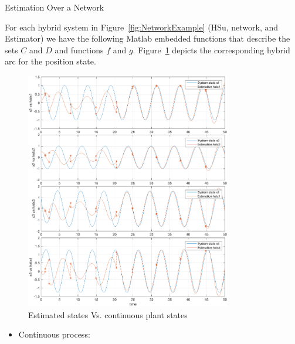 \begin{example}{Estimation Over a Network}
\begin{itemize}
\end{itemize}



For each hybrid system in Figure~\ref{fig:NetworkExample} (HSu, network, and Estimator) we have the following Matlab embedded functions that describe the sets $C$ and $D$ and functions $f$ and $g$.
Figure~\ref{fig:Net-Est} depicts the corresponding hybrid arc for the position state.

\begin{figure}[ht]
  \begin{center}
    \includegraphics[width=0.8\textwidth]{figures/Simulink/ResultsNetworkEstimator1.eps}
   \caption{Estimated states Vs. continuous plant states}
\label{fig:Net-Est}
  \end{center}
\end{figure}


\begin{itemize}
\item Continuous process:


\end{itemize}
\end{example}
